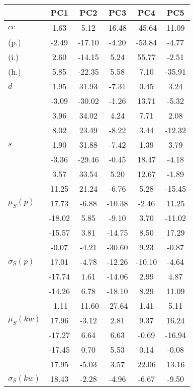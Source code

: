\begin{table}[h!]
\begin{center}
\begin{tabular}{| l | c | c | c | c | c |}\hline
 & PC1 & PC2 & PC3 & PC4 & PC5 \\\hline
$cc$ & 1.63  & 5.12  & 16.48  & -45.64  & 11.09 \\\hline
(p.) & -2.49  & -17.10  & -4.20  & -53.84  & -4.77 \\\hline
(i.) & 2.60  & -14.15  & 5.24  & 55.77  & -2.51 \\\hline
(h.) & 5.85  & -22.35  & 5.58  & 7.10  & -35.91 \\\hline
$d$ & 1.95  & 31.93  & -7.31  & 0.45  & 3.24 \\\hline
 & -3.09  & -30.02  & -1.26  & 13.71  & -5.32 \\\hline
 & 3.96  & 34.02  & 4.24  & 7.71  & 2.08 \\\hline
 & 8.02  & 23.49  & -8.22  & 3.44  & -12.32 \\\hline
$s$ & 1.90  & 31.88  & -7.42  & 1.39  & 3.79 \\\hline
 & -3.36  & -29.46  & -0.45  & 18.47  & -4.18 \\\hline
 & 3.57  & 33.54  & 5.20  & 12.67  & -1.89 \\\hline
 & 11.25  & 21.24  & -6.76  & 5.28  & -15.45 \\\hline
$\mu_S(p)$ & 17.73  & -6.88  & -10.38  & -2.46  & 11.25 \\\hline
 & -18.02  & 5.85  & -9.10  & 3.70  & -11.02 \\\hline
 & -15.57  & 3.81  & -14.75  & 8.50  & 17.29 \\\hline
 & -0.07  & -4.21  & -30.60  & 9.23  & -0.87 \\\hline
$\sigma_S(p)$ & 17.01  & -4.78  & -12.26  & -10.10  & -4.64 \\\hline
 & -17.74  & 1.61  & -14.06  & 2.99  & 4.87 \\\hline
 & -14.26  & 6.78  & -18.10  & 8.29  & 11.09 \\\hline
 & -1.11  & -11.60  & -27.64  & 1.41  & 5.11 \\\hline
$\mu_S(kw)$ & 17.96  & -3.12  & 2.81  & 9.37  & 16.24 \\\hline
 & -17.27  & 6.64  & 6.63  & -0.69  & -16.94 \\\hline
 & -17.45  & 0.70  & 5.53  & 0.14  & -0.08 \\\hline
 & 17.95  & -5.03  & 3.57  & 22.06  & 13.16 \\\hline
$\sigma_S(kw)$ & 18.43  & -2.28  & -4.96  & -6.67  & -9.50 \\\hline

\end{tabular}
\end{center}
\end{table}
